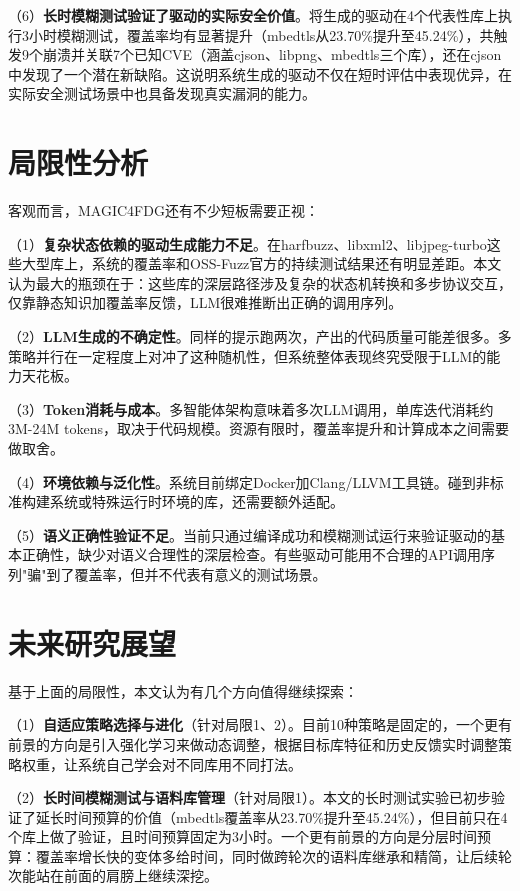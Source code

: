 （6）\textbf{长时模糊测试验证了驱动的实际安全价值}。将生成的驱动在4个代表性库上执行3小时模糊测试，覆盖率均有显著提升（mbedtls从23.70\%提升至45.24\%），共触发9个崩溃并关联7个已知CVE（涵盖cjson、libpng、mbedtls三个库），还在cjson中发现了一个潜在新缺陷。这说明系统生成的驱动不仅在短时评估中表现优异，在实际安全测试场景中也具备发现真实漏洞的能力。

\section{局限性分析}

客观而言，MAGIC4FDG还有不少短板需要正视：

（1）\textbf{复杂状态依赖的驱动生成能力不足}。在harfbuzz、libxml2、libjpeg-turbo这些大型库上，系统的覆盖率和OSS-Fuzz官方的持续测试结果还有明显差距。本文认为最大的瓶颈在于：这些库的深层路径涉及复杂的状态机转换和多步协议交互，仅靠静态知识加覆盖率反馈，LLM很难推断出正确的调用序列。

（2）\textbf{LLM生成的不确定性}。同样的提示跑两次，产出的代码质量可能差很多。多策略并行在一定程度上对冲了这种随机性，但系统整体表现终究受限于LLM的能力天花板。

（3）\textbf{Token消耗与成本}。多智能体架构意味着多次LLM调用，单库迭代消耗约3M-24M tokens，取决于代码规模。资源有限时，覆盖率提升和计算成本之间需要做取舍。

（4）\textbf{环境依赖与泛化性}。系统目前绑定Docker加Clang/LLVM工具链。碰到非标准构建系统或特殊运行时环境的库，还需要额外适配。

（5）\textbf{语义正确性验证不足}。当前只通过编译成功和模糊测试运行来验证驱动的基本正确性，缺少对语义合理性的深层检查。有些驱动可能用不合理的API调用序列"骗"到了覆盖率，但并不代表有意义的测试场景。

\section{未来研究展望}

基于上面的局限性，本文认为有几个方向值得继续探索：

（1）\textbf{自适应策略选择与进化}（针对局限1、2）。目前10种策略是固定的，一个更有前景的方向是引入强化学习\cite{sutton2018}来做动态调整，根据目标库特征和历史反馈实时调整策略权重，让系统自己学会对不同库用不同打法。

（2）\textbf{长时间模糊测试与语料库管理}（针对局限1）。本文的长时测试实验已初步验证了延长时间预算的价值（mbedtls覆盖率从23.70\%提升至45.24\%），但目前只在4个库上做了验证，且时间预算固定为3小时。一个更有前景的方向是分层时间预算：覆盖率增长快的变体多给时间，同时做跨轮次的语料库继承和精简，让后续轮次能站在前面的肩膀上继续深挖。


